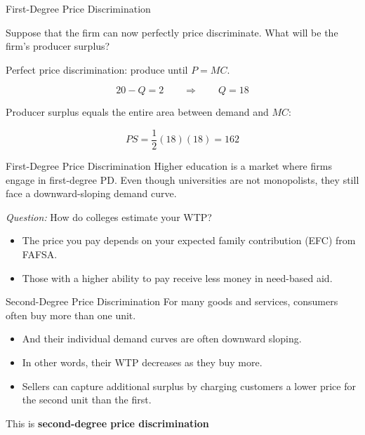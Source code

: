 \documentclass{beamer}
\begin{document}
\begin{frame}{First-Degree Price Discrimination}


  Suppose that the firm can now perfectly price discriminate. What will be the firm's producer surplus?
\end{frame}

\begin{frame}

Perfect price discrimination: produce until \(P=MC\).

\[
20-Q=2
\qquad\Rightarrow\qquad
Q=18
\]

Producer surplus equals the entire area between demand and \(MC\):

\[
PS=\frac{1}{2}(18)(18)=162
\]

\begin{center}
\end{center}

\end{frame}

\begin{frame}{First-Degree Price Discrimination}
  Higher education is a market where firms engage in first-degree PD. Even though universities are not monopolists, they still face a downward-sloping demand curve.

  \bigskip
  \emph{Question:} How do colleges estimate your WTP?

  \begin{itemize}
    \item The price you pay depends on your expected family contribution (EFC) from FAFSA.
    
    \item Those with a higher ability to pay receive less money in need-based aid.
  \end{itemize}

\end{frame}

\begin{frame}{Second-Degree Price Discrimination}
  For many goods and services, consumers often buy more than one unit.

  \begin{itemize}
    \item And their individual demand curves are often downward sloping.
    
    \item In other words, their WTP decreases as they buy more.
    
    \item Sellers can capture additional surplus by charging customers a lower price for the second unit than the first.
  \end{itemize}

  \bigskip
  This is \textbf{second-degree price discrimination}
\end{frame}
\end{document}
